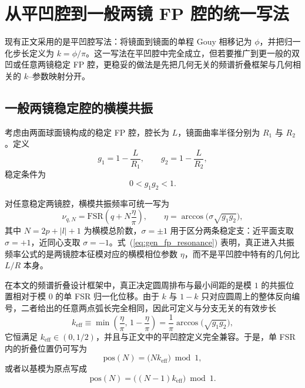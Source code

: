 \section{从平凹腔到一般两镜 FP 腔的统一写法}

现有正文采用的是平凹腔写法：将镜面到镜面的单程 Gouy 相移记为 $\phi$，并把归一化步长定义为 $k=\phi/\pi$。这一写法在平凹腔中完全成立，但若要推广到更一般的双凹或任意两镜稳定 FP 腔，更稳妥的做法是先把几何无关的频谱折叠框架与几何相关的 $k$--参数映射分开。

\subsection{一般两镜稳定腔的横模共振}

考虑由两面球面镜构成的稳定 FP 腔，腔长为 $L$，镜面曲率半径分别为 $R_1$ 与 $R_2$。定义
\begin{equation}
g_1 = 1-\frac{L}{R_1},
\qquad
g_2 = 1-\frac{L}{R_2},
\label{eq:gen_fp_g_params}
\end{equation}
稳定条件为
\begin{equation}
0<g_1 g_2<1.
\label{eq:gen_fp_stability}
\end{equation}

对任意稳定两镜腔，横模共振频率可统一写为
\begin{equation}
\nu_{q,N}
=\mathrm{FSR}\!\left(
q+N\frac{\eta}{\pi}
\right),
\qquad
\eta=\arccos\!\bigl(\sigma\sqrt{g_1 g_2}\bigr),
\label{eq:gen_fp_resonance}
\end{equation}
其中 $N=2p+|l|+1$ 为横模总阶数，$\sigma=\pm1$ 用于区分两条稳定支：近平面支取 $\sigma=+1$，近同心支取 $\sigma=-1$。式~(\ref{eq:gen_fp_resonance}) 表明，真正进入共振频率公式的是两镜腔本征模对应的横模相位参数 $\eta$，而不是平凹腔中特有的几何比 $L/R$ 本身。

在本文的频谱折叠设计框架中，真正决定圆周排布与最小间距的是模 $1$ 的共振位置相对于模 $0$ 的单 FSR 归一化位移。由于 $k$ 与 $1-k$ 只对应圆周上的整体反向编号，二者给出的任意两点弧长完全相同，因此可定义与分支无关的有效步长
\begin{equation}
k_{\mathrm{eff}}
\equiv
\min\!\left(\frac{\eta}{\pi},\,1-\frac{\eta}{\pi}\right)
=
\frac{1}{\pi}\arccos\!\bigl(\sqrt{g_1 g_2}\bigr),
\label{eq:gen_fp_keff}
\end{equation}
它恒满足 $k_{\mathrm{eff}}\in(0,1/2)$，并且与正文中的平凹腔定义完全兼容。于是，单 FSR 内的折叠位置仍可写为
\begin{equation}
\mathrm{pos}(N)=\bigl(Nk_{\mathrm{eff}}\bigr)\bmod 1,
\label{eq:gen_fp_pos}
\end{equation}
或者以基模为原点写成
\begin{equation}
\mathrm{pos}(N)=\bigl((N-1)k_{\mathrm{eff}}\bigr)\bmod 1.
\label{eq:gen_fp_pos_shifted}
\end{equation}

